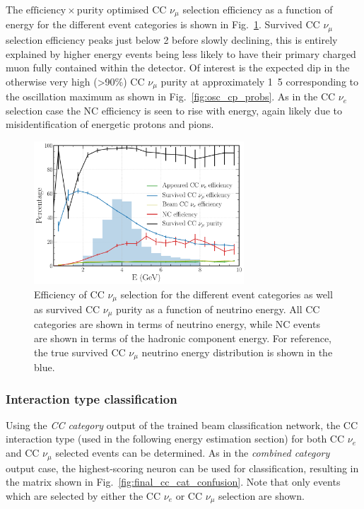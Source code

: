 The $\mathrm{efficiency}\times\mathrm{purity}$ optimised CC $\nu_{\mu}$ selection efficiency as a
function of energy for the different event categories is shown in Fig.~\ref{fig:final_numu_hists}.
Survived CC $\nu_{\mu}$ selection efficiency peaks just below \unit{2}{\GeV} before slowly
declining, this is entirely explained by higher energy events being less likely to have their
primary charged muon fully contained within the detector. Of interest is the expected dip in the
otherwise very high (>90\%) CC $\nu_{\mu}$ purity at approximately \unit{1.5}{\GeV} corresponding
to the oscillation maximum as shown in Fig.~\ref{fig:osc_cp_probs}. As in the CC $\nu_{e}$
selection case the NC efficiency is seen to rise with energy, again likely due to
misidentification of energetic protons and pions.

\begin{figure} %
    \includegraphics[width=0.7\textwidth]{diagrams/7-results/final_numu_hists.pdf}
    \caption[Efficiency of CC $\nu_{\mu}$ selection as a function of energy]
    {Efficiency of CC $\nu_{\mu}$ selection for the different event categories as well as survived
        CC $\nu_{\mu}$ purity as a function of neutrino energy. All CC categories are shown in terms
        of neutrino energy, while NC events are shown in terms of the hadronic component energy. For
        reference, the true survived CC $\nu_{\mu}$ neutrino energy distribution is shown in the
        blue.}
    \label{fig:final_numu_hists}
\end{figure}

\subsubsection*{Interaction type classification} %

Using the \emph{CC category} output of the trained beam classification network, the CC interaction
type (used in the following energy estimation section) for both CC $\nu_{e}$ and CC $\nu_{\mu}$
selected events can be determined. As in the \emph{combined category} output case, the
highest-scoring neuron can be used for classification, resulting in the matrix shown in
Fig.~\ref{fig:final_cc_cat_confusion}. Note that only events which are selected by either the CC
$\nu_{e}$ or CC $\nu_{\mu}$ selection are shown.

